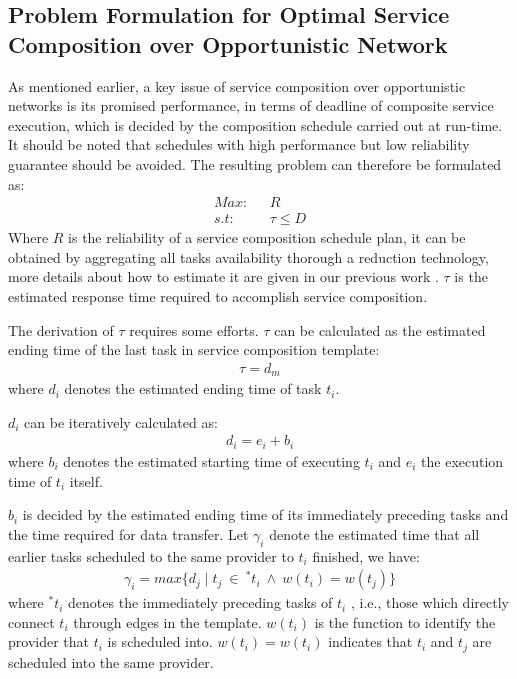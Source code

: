 \documentclass[journal]{IEEEtran}
\begin{document}
\subsection{Problem Formulation for Optimal Service Composition over Opportunistic Network}

As mentioned earlier, a key issue of service composition over opportunistic networks is its promised performance, in terms of deadline of composite service execution, which is decided by the composition schedule carried out at run-time. It should be noted that schedules with high performance but low reliability guarantee should be avoided. The resulting problem can therefore be formulated as:
\begin{align}
Max    : \ \ \ & R   \\\nonumber
s.t    : \ \ \ & \tau \le D
\end{align}
Where $R$ is the reliability of a service composition schedule plan, it can be obtained by aggregating all tasks availability thorough a reduction technology, more details about how to estimate it are given in our previous work \cite{xia2009novel}. $\tau$ is the estimated response time required to accomplish service composition. 

The derivation of $\tau$ requires some efforts. $\tau$ can be calculated as the estimated ending time of the last task in service composition template:
\begin{align}
\tau = d_m
\end{align}
where $d_i$ denotes the estimated ending time of task $t_i$.

$d_i$ can be iteratively calculated as:
\begin{align}
d_i = e_i + b_i
\end{align}
where $b_i$ denotes the estimated starting time of executing $t_i$ and $e_i$ the execution time of $t_i$ itself.

$b_i$ is decided by the estimated ending time of its immediately preceding tasks and the time required for data transfer. Let $\gamma_i$ denote the estimated time that all earlier tasks scheduled to the same provider to $t_i$ finished, we have:
\begin{align}
\gamma_i =  max\{d_j \mid t_j \ \in \ ^{*}t_i \ \wedge \ w(t_i) = w(t_j) \}
\end{align}
where $^{*}t_i$ denotes the immediately preceding tasks of $t_i$ , i.e., those which directly connect $t_i$ through edges in the template. 
$w(t_i)$ is the function to identify the provider that $t_i$ is scheduled into. $w(t_i) = w(t_i)$ indicates that $t_i$ and $t_j$ are scheduled into the same provider.
\end{document}
